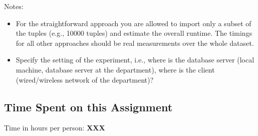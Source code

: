 \documentclass[11pt]{scrartcl}
\begin{document}
  \bigskip

  \noindent Notes:
  \begin{itemize}
  \item For the straightforward approach you are allowed to import
    only a subset of the tuples (e.g., 10000 tuples) and estimate the
    overall runtime. The timings for all other approaches should be
    real measurements over the whole dataset.
  \item Specify the setting of the experiment, i.e., where is the
    database server (local machine, database server at the
    department), where is the client (wired/wireless network of the
    department)?
\end{itemize}

  \subsection*{Time Spent on this Assignment}

  Time in hours per person: {\bf XXX}
\end{document}
